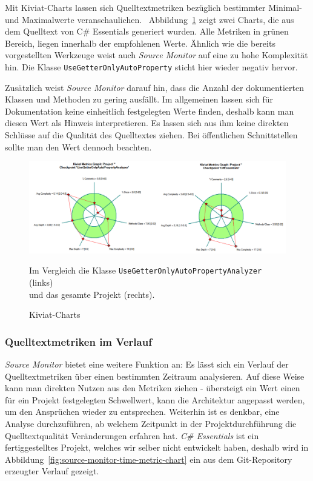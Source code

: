 Mit Kiviat-Charts lassen sich Quelltextmetriken bezüglich bestimmter Minimal- und Maximalwerte veranschaulichen.~\cite{kiviat} Abbildung~\ref{fig:source-monitor-kiviat-chart} zeigt zwei Charts, die aus dem Quelltext von C\# Essentials generiert wurden. Alle Metriken in grünen Bereich, liegen innerhalb der empfohlenen Werte. Ähnlich wie die bereits vorgestellten Werkzeuge weist auch \emph{Source Monitor} auf eine zu hohe Komplexität hin. Die Klasse \texttt{UseGetterOnlyAutoProperty} sticht hier wieder negativ hervor.

Zusätzlich weist \emph{Source Monitor} darauf hin, dass die Anzahl der dokumentierten Klassen und Methoden zu gering ausfällt. Im allgemeinen lassen sich für Dokumentation keine einheitlich festgelegten Werte finden, deshalb kann man diesen Wert als Hinweis interpretieren. Es lassen sich aus ihm keine direkten Schlüsse auf die Qualität des Quelltextes ziehen. Bei öffentlichen Schnittstellen sollte man den Wert dennoch beachten.

\begin{figure}[!ht]
	\centering
	\includegraphics[width=\textwidth]{images/source-monitor-kiviat-chart.png}
	\caption{Kiviat-Charts}
	\vspace{0.1cm}
	Im Vergleich die Klasse \texttt{UseGetterOnlyAutoPropertyAnalyzer} (links) \\ und das gesamte Projekt (rechts).
	\label{fig:source-monitor-kiviat-chart}
\end{figure}

\newpage

\subsubsection{Quelltextmetriken im Verlauf}
\emph{Source Monitor} bietet eine weitere Funktion an: Es lässt sich ein Verlauf der Quelltextmetriken über einen bestimmten Zeitraum analysieren. Auf diese Weise kann man direkten Nutzen aus den Metriken ziehen - übersteigt ein Wert einen für ein Projekt festgelegten Schwellwert, kann die Architektur angepasst werden, um den Ansprüchen wieder zu entsprechen. Weiterhin ist es denkbar, eine Analyse durchzuführen, ab welchem Zeitpunkt in der Projektdurchführung die Quelltextqualität Veränderungen erfahren hat. \emph{C\# Essentials} ist ein fertiggestelltes Projekt, welches wir selber nicht entwickelt haben, deshalb wird in Abbildung~\ref{fig:source-monitor-time-metric-chart} ein aus dem Git-Repository erzeugter Verlauf gezeigt.

